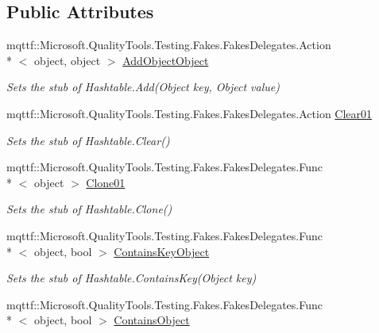 \subsection*{Public Attributes}
\begin{DoxyCompactItemize}
\item 
mqttf\-::\-Microsoft.\-Quality\-Tools.\-Testing.\-Fakes.\-Fakes\-Delegates.\-Action\\*
$<$ object, object $>$ \hyperlink{class_system_1_1_collections_1_1_fakes_1_1_stub_hashtable_aa48bb568295c2ac85ac8ca0086146d36}{Add\-Object\-Object}
\begin{DoxyCompactList}\small\item\em Sets the stub of Hashtable.\-Add(\-Object key, Object value)\end{DoxyCompactList}\item 
mqttf\-::\-Microsoft.\-Quality\-Tools.\-Testing.\-Fakes.\-Fakes\-Delegates.\-Action \hyperlink{class_system_1_1_collections_1_1_fakes_1_1_stub_hashtable_a0d779b6a9bac78e6b5e9affa8c12b50c}{Clear01}
\begin{DoxyCompactList}\small\item\em Sets the stub of Hashtable.\-Clear()\end{DoxyCompactList}\item 
mqttf\-::\-Microsoft.\-Quality\-Tools.\-Testing.\-Fakes.\-Fakes\-Delegates.\-Func\\*
$<$ object $>$ \hyperlink{class_system_1_1_collections_1_1_fakes_1_1_stub_hashtable_af1703d33b1f0866a1473d65b00fdf1ad}{Clone01}
\begin{DoxyCompactList}\small\item\em Sets the stub of Hashtable.\-Clone()\end{DoxyCompactList}\item 
mqttf\-::\-Microsoft.\-Quality\-Tools.\-Testing.\-Fakes.\-Fakes\-Delegates.\-Func\\*
$<$ object, bool $>$ \hyperlink{class_system_1_1_collections_1_1_fakes_1_1_stub_hashtable_a1b47db1d05625fbd1639df68ce621fd3}{Contains\-Key\-Object}
\begin{DoxyCompactList}\small\item\em Sets the stub of Hashtable.\-Contains\-Key(\-Object key)\end{DoxyCompactList}\item 
mqttf\-::\-Microsoft.\-Quality\-Tools.\-Testing.\-Fakes.\-Fakes\-Delegates.\-Func\\*
$<$ object, bool $>$ \hyperlink{class_system_1_1_collections_1_1_fakes_1_1_stub_hashtable_a4b0ff8b18b288408cde213fc24305878}{Contains\-Object}

\end{DoxyCompactItemize}
